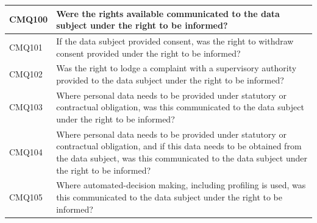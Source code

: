 \begin{table}
\begin{tabularx}{\textwidth}{|l|X|}
CMQ100 & Were the rights available communicated to the data subject under the right to be informed? \\ \hline
CMQ101 & If the data subject provided consent, was the right to withdraw consent provided under the right to be informed? \\ \hline
CMQ102 & Was the right to lodge a complaint with a supervisory authority provided to the data subject under the right to be informed? \\ \hline
CMQ103 & Where personal data needs to be provided under statutory or contractual obligation, was this communicated to the data subject under the right to be informed? \\ \hline
CMQ104 & Where personal data needs to be provided under statutory or contractual obligation, and if this data needs to be obtained from the data subject, was this communicated to the data subject under the right to be informed? \\ \hline
CMQ105 & Where automated-decision making, including profiling is used, was this communicated to the data subject under the right to be informed? \\ \hline
\end{tabularx}
\end{table}
